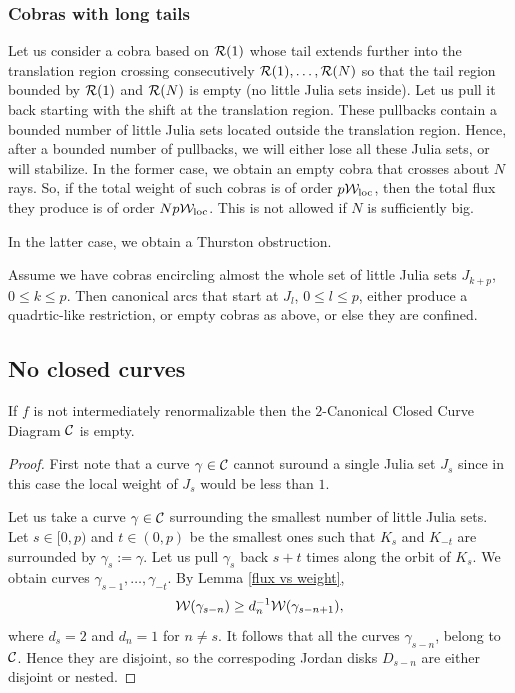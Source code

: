 {{ 

\msk
\subsubsection{Cobras with long tails} 

Let us consider a cobra based on ${\mathcal R}(1)$ whose tail extends further
into the translation region crossing consecutively ${\mathcal R}(1), \dots , {\mathcal R}(N)$ so that the tail region
 bounded by ${\mathcal R}(1)$ and ${\mathcal R}(N)$ is empty (no little Julia sets inside). 
Let us pull it back starting with   the shift at the translation region. These
pullbacks contain a bounded number of little Julia sets located outside
the translation region.  Hence, after a bounded number of pullbacks,
we will either lose all these Julia sets, or will stabilize. In the
former case, we obtain an empty cobra that crosses about $N$ rays.
So, if the total weight of such cobras is of order $p{\mathcal W}_{\mathrm{loc}}$, then the
total flux they produce is of order $Np {\mathcal W}_{\mathrm{loc}}$.  This is not
allowed if $N$ is sufficiently big. 

In the latter case, we obtain a Thurston obstruction.   
 
Assume we have cobras encircling  almost the whole set
of little Julia sets $J_{k+p}$, $0\leq k\leq p$. 
Then canonical arcs that start at $J_l$, $0\leq l\leq p$, 
either produce a quadrtic-like restriction, or empty cobras as above, 
or else they are confined. 


\subsection{No closed curves}

\begin{lem}
  If $f$ is not intermediately renormalizable then the $2$-Canonical Closed Curve
  Diagram ${\mathcal C}$ is empty. 
\end{lem}

\begin{proof}
First note that a curve $\gamma\in {\mathcal C}$ cannot suround a single Julia set $J_s$ since in this case
the local weight of $J_s$ would be less than $1$. 


 Let us take a curve $\gamma\in {\mathcal C}$ surrounding the
  smallest number of little Julia sets.  
  Let $s\in [0,p)$ and $t\in (0,p)$ be the smallest ones such that $K_s$ and $K_{-t}$
  are surrounded by $\gamma_s:= \gamma$.
Let us pull $\gamma_s$ back $s+t$ times along the
  orbit of $K_s$. We obtain curves $\gamma_{s-1}, \dots, \gamma_{-t}$. 
By Lemma \ref{flux vs weight},
$$
   {\mathcal W}(\gamma_{s-n}) \geq d_n^{-1}  {\mathcal W}(\gamma_{s-n+1}),
$$
where $d_s=2$ and  $d_n=1 $ for $n\not=s$. It follows that all the curves $\gamma_{s-n}$,
belong to ${\mathcal C}$.
Hence they are disjoint, so the correspoding Jordan disks $D_{s-n}$ are either disjoint or nested.  


\end{proof}}}
